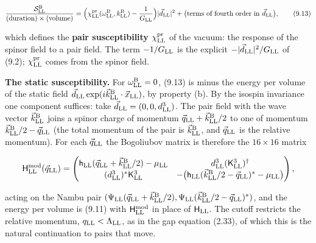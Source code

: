 \documentclass[
  10pt,
]{article}
\begin{document}
\[\frac{\mathcal S^{\rm B}_{\rm LL}}{(\text{duration})\times(\text{volume})}=\Big(\chi^{\rm pr}_{\rm LL}(\omega^{\rm B}_{\rm LL},k^{\rm B}_{\rm LL})-\frac1{G_{\rm LL}}\Big)\lvert\vec d_{\rm LL}\rvert^2+\big(\text{terms of fourth order in }\vec d_{\rm LL}\big),\tag{9.13}\]

which defines the \textbf{pair susceptibility}
\(\chi^{\rm pr}_{\rm LL}\) of the vacuum: the response of the spinor
field to a pair field. The term \(-1/G_{\rm LL}\) is the explicit
\(-\lvert\vec d_{\rm LL}\rvert^2/G_{\rm LL}\) of (9.2);
\(\chi^{\rm pr}_{\rm LL}\) comes from the spinor field.

\textbf{The static susceptibility.} For \(\omega^{\rm B}_{\rm LL}=0\),
(9.13) is minus the energy per volume of the static field
\(\vec d_{\rm LL}\exp(i\vec k^{\rm B}_{\rm LL}\cdot\vec x_{\rm LL})\),
by property (b). By the isospin invariance one component suffices: take
\(\vec d_{\rm LL}=(0,0,d^3_{\rm LL})\). The pair field with the wave
vector \(\vec k^{\rm B}_{\rm LL}\) joins a spinor charge of momentum
\(\vec q_{\rm LL}+\vec k^{\rm B}_{\rm LL}/2\) to one of momentum
\(\vec k^{\rm B}_{\rm LL}/2-\vec q_{\rm LL}\) (the total momentum of the
pair is \(\vec k^{\rm B}_{\rm LL}\), and \(\vec q_{\rm LL}\) is the
relative momentum). For each \(\vec q_{\rm LL}\) the Bogoliubov matrix
is therefore the \(16\times16\) matrix

\[\mathsf H^{\rm mod}_{\rm LL}(\vec q_{\rm LL})=\begin{pmatrix}\mathsf h_{\rm LL}(\vec q_{\rm LL}+\vec k^{\rm B}_{\rm LL}/2)-\mu_{\rm LL}&d^3_{\rm LL}(\mathsf K^3_{\rm LL})^\dagger\\(d^3_{\rm LL})^*\mathsf K^3_{\rm LL}&-\big(\mathsf h_{\rm LL}(\vec k^{\rm B}_{\rm LL}/2-\vec q_{\rm LL})^*-\mu_{\rm LL}\big)\end{pmatrix},\]

acting on the Nambu pair
\((\Psi_{\rm LL}(\vec q_{\rm LL}+\vec k^{\rm B}_{\rm LL}/2),\Psi_{\rm LL}(\vec k^{\rm B}_{\rm LL}/2-\vec q_{\rm LL})^*)\),
and the energy per volume is (9.11) with
\(\mathsf H^{\rm mod}_{\rm LL}\) in place of \(\mathsf H_{\rm LL}\). The
cutoff restricts the relative momentum, \(q_{\rm LL}<\Lambda_{\rm LL}\),
as in the gap equation (2.33), of which this is the natural continuation
to pairs that move.
\end{document}
